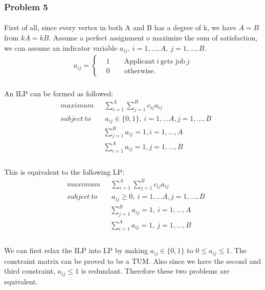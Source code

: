 \subsubsection*{Problem 5}
\paragraph{}
First of all, since every vertex in both A and B has a degree of k, we have $A=B$ from $kA=kB$. Assume a perfect assignment o maximize the sum of satisfaction, we can assume an indicator variable $a_{ij},\ i=1,...,A,\ j=1,...,B$.
\begin{align*}
a_{ij} = \begin{cases}
&1 \qquad \text{Applicant} \ i \ \text{gets job} \ j\\
&0 \qquad \text{otherwise}.
\end{cases}
\end{align*}
\paragraph{}
An ILP can be formed as followed:
\begin{align*}
& maximum \quad \ \ \sum_{i=1}^{A}\sum_{j=1}^{B}c_{ij}a_{ij} \\
& subject \ to \qquad a_{ij} \in\{0,1\},\ i=1,...A, j=1,...,B\\
&\qquad \qquad \quad \quad \sum_{j=1}^{B}a_{ij}=1, i=1,...,A\\
&\qquad \qquad \quad \quad \sum_{i=1}^{A}a_{ij}=1, j=1,...,B\\
\end{align*}
\paragraph{}
This is equivalent to the following LP:
\begin{align*}
& maximum \quad \ \ \sum_{i=1}^{A}\sum_{j=1}^{B}c_{ij}a_{ij} \\
& subject \ to \qquad a_{ij}\geq 0, \ i=1,...A, j=1,...,B\\
&\qquad \qquad \quad \quad \sum_{j=1}^{B}a_{ij}=1,\ i=1,...,A\\
&\qquad \qquad \quad \quad \sum_{i=1}^{A}a_{ij}=1,\ j=1,...,B\\
\end{align*}
\paragraph{}
We can first relax the ILP into LP by making $a_{ij} \in\{0,1\}$ to $0 \leq a_{ij}\leq 1$. The constraint matrix can be proved to be a TUM. Also since we have the second and third constraint, $a_{ij}\leq 1$ is redundant. Therefore these two problems are equivalent.
